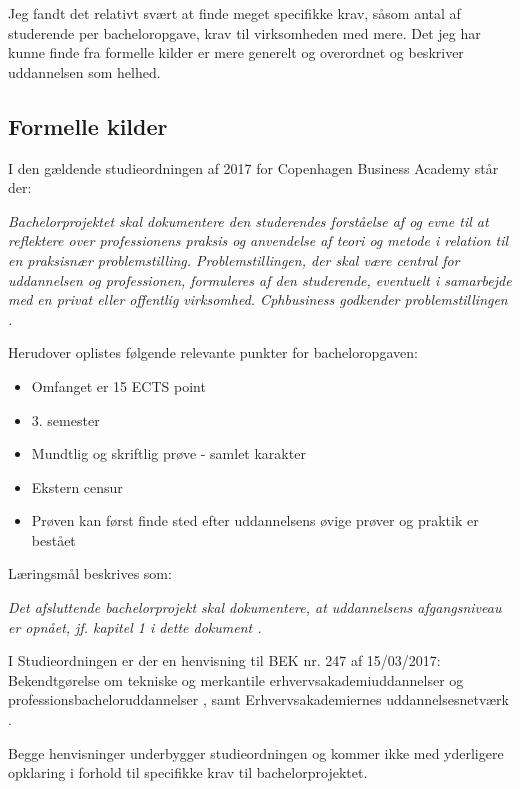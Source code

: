 
Jeg fandt det relativt svært at finde meget specifikke krav, såsom antal af studerende per bacheloropgave, krav til virksomheden med mere. Det jeg har kunne finde fra formelle kilder er mere generelt og overordnet og beskriver uddannelsen som helhed. 

\vspace{0.5cm}
\subsection{Formelle kilder}
\label{sec:2.1}

I den gældende studieordningen af 2017 for Copenhagen Business Academy står der:
\begin{displayquote}
\emph{Bachelorprojektet skal dokumentere den studerendes forståelse af og evne til at
reflektere over professionens praksis og anvendelse af teori og metode i relation til en
praksisnær problemstilling. Problemstillingen, der skal være central for uddannelsen og
professionen, formuleres af den studerende, eventuelt i samarbejde med en privat eller
offentlig virksomhed. Cphbusiness godkender problemstillingen \cite{cph}.} 
\end{displayquote}
\vspace{0.5cm}
Herudover oplistes følgende relevante punkter for bacheloropgaven:
\begin{itemize}
    \item Omfanget er 15 ECTS point
    \item 3. semester
    \item Mundtlig og skriftlig prøve - samlet karakter
    \item Ekstern censur
    \item Prøven kan først finde sted efter uddannelsens øvige prøver og praktik er bestået
\end{itemize}

Læringsmål beskrives som: 
\begin{displayquote}
\emph{Det afsluttende bachelorprojekt skal dokumentere, at uddannelsens afgangsniveau er opnået, jf. kapitel 1 i dette dokument \cite{cph}.} 
\end{displayquote}
\vspace{0.5cm}
I Studieordningen er der en henvisning til BEK nr. 247 af 15/03/2017: Bekendtgørelse om tekniske og merkantile erhvervsakademiuddannelser og professionsbacheloruddannelser \cite{bek}, samt Erhvervsakademiernes uddannelsesnetværk \cite{nek}.   

Begge henvisninger underbygger studieordningen og kommer ikke med yderligere opklaring i forhold til specifikke krav til bachelorprojektet. 


